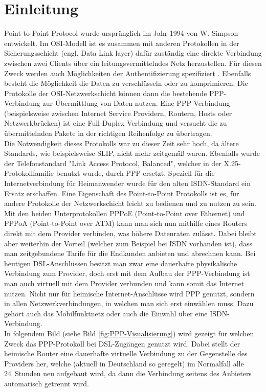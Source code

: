 \documentclass[journal,11pt]{IEEEtran}
\begin{document}
\section{Einleitung} 
 Point-to-Point Protocol wurde urspr\"unglich im Jahr 1994 von W. Simpson entwickelt. Im OSI-Modell ist es zusammen mit anderen Protokollen in der Sicherungsschicht (engl. Data Link layer) daf\"ur zust\"andig eine direkte Verbindung zwischen zwei Clients \"uber ein leitungsvermittelndes Netz herzustellen. F\"ur diesen Zweck werden auch M\"oglichkeiten der Authentifizierung spezifiziert \cite{RFC1661}. Ebenfalls besteht die M\"oglichkeit die Daten zu verschl\"usseln oder zu komprimieren. Die Protokolle der OSI-Netzwerkschicht k\"onnen dann die bestehende PPP-Verbindung zur \"Ubermittlung von Daten nutzen. Eine PPP-Verbindung (beispielsweise zwischen Internet Service Providern, Routern, Hosts oder Netzwerkbr\"ucken) ist eine Full-Duplex Verbindung und versucht die zu \"ubermittelnden Pakete in der richtigen Reihenfolge zu \"ubertragen.\\
Die Notwendigkeit dieses Protokolls war zu dieser Zeit sehr hoch, da \"altere Standards, wie beispielsweise SLIP, nicht mehr zeitgem\"a\ss{} waren. Ebenfalls wurde der Telefonstandard "Link Access Protocol, Balanced", welcher in der X.25-Protokollfamilie benutzt wurde, durch PPP ersetzt.  Speziell f\"ur die Internetverbindung f\"ur Heimanwender wurde f\"ur den alten ISDN-Standard ein Ersatz erschaffen. Eine Eigenschaft des Point-to-Point Protokolls ist es, f\"ur andere Protokolle der Netzwerkschicht leicht zu bedienen und zu nutzen zu sein. Mit den beiden Unterprotokollen PPPoE (Point-to-Point over Ethernet)\cite{RFC2516} und PPPoA (Point-to-Point over ATM)\cite{RFC2364} kann man sich nun mithilfe eines Routers direkt mit dem Provider verbinden, was h\"ohere Datenraten zul\"asst. Dabei bleibt aber weiterhin der Vorteil (welcher zum Beispiel bei ISDN vorhanden ist), dass man zeitgebundene Tarife f\"ur die Endkunden anbieten und abrechnen kann. Bei heutigen DSL-Anschl\"ussen besitzt man zwar eine dauerhafte physikalische Verbindung zum Provider, doch erst mit dem Aufbau der PPP-Verbindung ist man auch virtuell mit dem Provider verbunden und kann somit das Internet nutzen. Nicht nur f\"ur heimische Internet-Anschl\"usse wird PPP genutzt, sondern in allen Netzwerkverbindungen, in welchen man sich erst einw\"ahlen muss. Dazu geh\"ort auch das Mobilfunktnetz oder auch die Einwahl \"uber eine ISDN-Verbindung.\\
In folgendem Bild (siehe Bild \ref{fig:PPP-Visualisierung}) wird gezeigt f\"ur welchen Zweck das PPP-Protokoll bei DSL-Zug\"angen genutzt wird. Dabei stellt der heimische Router eine dauerhafte virtuelle Verbindung zu der Gegenstelle des Providers her, welche (aktuell in Deutschland so geregelt) im Normalfall alle 24~Stunden neu aufgebaut wird, da dann die Verbindung seitens des Anbieters automatisch getrennt wird. \\
\end{document}
